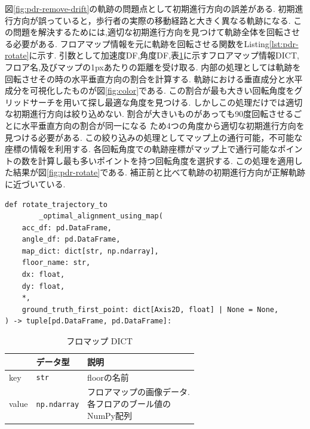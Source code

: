 
図\ref{fig:pdr-remove-drift}の軌跡の問題点として初期進行方向の誤差がある.
初期進行方向が誤っていると，歩行者の実際の移動経路と大きく異なる軌跡になる.
この問題を解決するためには,適切な初期進行方向を見つけて軌跡全体を回転させる必要がある.
フロアマップ情報を元に軌跡を回転させる関数をListing\ref{lst:pdr-rotate}に示す.
引数として加速度DF,角度DF,表\ref{tab:map_dict}に示すフロアマップ情報DICT,フロア名,及びマップの1pxあたりの距離を受け取る.
内部の処理としては軌跡を回転させその時の水平垂直方向の割合を計算する.
軌跡における垂直成分と水平成分を可視化したものが図\ref{fig:color}である.
この割合が最も大きい回転角度をグリッドサーチを用いて探し最適な角度を見つける.
しかしこの処理だけでは適切な初期進行方向は絞り込めない.
割合が大きいものがあっても90度回転させるごとに水平垂直方向の割合が同一になる
ため4つの角度から適切な初期進行方向を見つける必要がある.
この絞り込みの処理としてマップ上の通行可能，不可能な座標の情報を利用する.
各回転角度での軌跡座標がマップ上で通行可能なポイントの数を計算し最も多いポイントを持つ回転角度を選択する.
この処理を適用した結果が図\ref{fig:pdr-rotate}である.
補正前と比べて軌跡の初期進行方向が正解軌跡に近づいている.

\begin{lstlisting}[caption={初期進行方向補正}, label=lst:pdr-rotate]
def rotate_trajectory_to
		_optimal_alignment_using_map(
    acc_df: pd.DataFrame,
    angle_df: pd.DataFrame,
    map_dict: dict[str, np.ndarray],
    floor_name: str,
    dx: float,
    dy: float,
    *,
    ground_truth_first_point: dict[Axis2D, float] | None = None,
) -> tuple[pd.DataFrame, pd.DataFrame]:
\end{lstlisting}

\begin{table}[ht]
	\centering
	\begin{tabular}{lll}
		\hline
		      & \textbf{データ型}       & \textbf{説明}             \\ \hline
		key   & \texttt{str}        & floorの名前                \\ \hline
		value & \texttt{np.ndarray} & \makecell{フロアマップの画像データ. \\各フロアのブール値の\\NumPy配列} \\ \hline
	\end{tabular}
	\caption{フロマップ DICT}
	\label{tab:map_dict}
\end{table}

